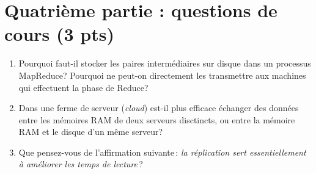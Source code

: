 \documentclass[11pt,a4paper]{article}
\begin{document}
\section*{Quatrième partie : questions de cours (3 pts)}

\begin{enumerate}
 \item Pourquoi faut-il stocker les paires intermédiaires sur disque dans un processus
 MapReduce? Pourquoi ne peut-on directement les transmettre aux machines qui effectuent
 la phase de Reduce?
 
\item Dans une ferme de serveur (\textit{cloud}) est-il plus efficace échanger des données
   entre les mémoires RAM de deux serveurs disctincts, ou entre la mémoire RAM et le disque d'un même serveur?
  
      \item Que pensez-vous de l'affirmation suivante\,: \emph{la réplication sert essentiellement
        à améliorer les temps de lecture}\,?
    
\end{enumerate}
\end{document}
